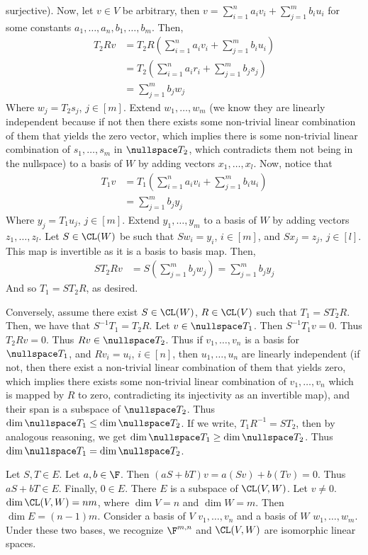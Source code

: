 \documentclass{book}
\begin{document}
\begin{enumerate}[label=\arabic*)]
      surjective). Now, let $v \in V$ be arbitrary, then $v = \sum_{i = 1}^{n}a_iv_i + \sum_{j = 1}^{m}b_iu_i$ for some constants $a_1, \dots, a_n, b_1, \dots, b_m$. Then,
      \begin{align*}
        T_2Rv & = T_2R(\sum_{i = 1}^{n}a_iv_i + \sum_{j = 1}^{m}b_iu_i) \\
        & = T_2(\sum_{i = 1}^{n}a_ir_i + \sum_{j = 1}^{m}b_js_j) \\
        & = \sum_{j = 1}^{m}b_jw_j
      \end{align*}
      Where $w_j = T_2s_j$, $j \in [m]$. Extend $w_1, \dots, w_m$ (we know they are linearly independent because if not then there exists some non-trivial linear combination of them that
      yields the zero vector, which implies there is some non-trivial linear combination of $s_1, \dots, s_m$ in $\nullspace T_2$, which contradicts them not being in the nullspace) to a
      basis of $W$ by adding vectors $x_1, \dots, x_l$. Now, notice that
      \begin{align*}
        T_1v & = T_1(\sum_{i = 1}^{n}a_iv_i + \sum_{j = 1}^{m}b_iu_i) \\
        & = \sum_{j = 1}^{m}b_jy_j
      \end{align*}
      Where $y_j = T_1u_j$, $j \in [m]$. Extend $y_1, \dots, y_m$ to a basis of $W$ by adding vectors $z_1, \dots, z_l$. Let $S \in \CL(W)$ be such that $Sw_i = y_i$, $i \in [m]$, and $Sx_j
      = z_j$, $j \in [l]$. This map is invertible as it is a basis to basis map. Then, 
      \begin{align*}
        ST_2Rv & = S(\sum_{j = 1}^{m}b_jw_j) = \sum_{j = 1}^{m}b_jy_j
      \end{align*}
      And so $T_1 = ST_2R$, as desired.

      Conversely, assume there exist $S \in \CL(W)$, $R \in \CL(V)$ such that $T_1 = ST_2R$. Then, we have that $S^{-1}T_1 = T_2R$. Let $v \in \nullspace T_1$. Then $S^{-1}T_1v = 0$. Thus
      $T_2Rv = 0$. Thus $Rv \in \nullspace T_2$. Thus if $v_1, \dots, v_n$ is a basis for $\nullspace T_1$, and $Rv_i = u_i$, $i \in [n]$, then $u_1, \dots, u_n$ are linearly independent (if
      not, then there exist a non-trivial linear combination of them that yields zero, which implies there exists some non-trivial linear combination of $v_1, \dots, v_n$ which is mapped by
      $R$ to zero, contradicting its injectivity as an invertible map), and their span is a subspace of $\nullspace T_2$. Thus $\dim\nullspace T_1 \leq \dim\nullspace T_2$. If we write,
      $T_1R^{-1} = ST_2$, then by analogous reasoning, we get $\dim\nullspace T_1 \geq \dim\nullspace T_2$. Thus $\dim\nullspace T_1 = \dim\nullspace T_2$.
    \ii
      \begin{enumerate}[label=\alph*)]
        \ii Let $S, T \in E$. Let $a, b \in \F$. Then $(aS + bT)v = a(Sv) + b(Tv) = 0$. Thus $aS + bT \in E$. Finally, $0 \in E$. There $E$ is a subspace of $\CL(V, W)$.
        \ii Let $v \neq 0$. $\dim\CL(V, W) = nm$, where $\dim V = n$ and $\dim W = m$. Then $\dim E = (n - 1)m$. Consider a basis of $V$ $v_1, \dots, v_n$ and a basis of $W$ $w_1, \dots,
        w_m$. Under these two bases, we recognize $\F^{m, n}$ and $\CL(V, W)$ are isomorphic linear spaces.


\end{enumerate}
\end{enumerate}
\end{document}
